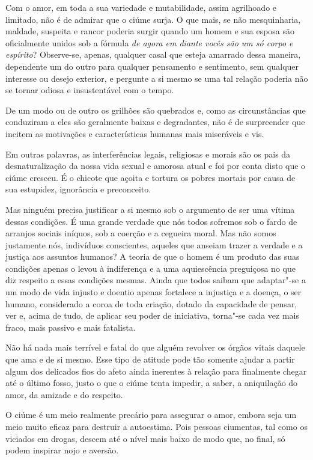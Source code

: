Com o amor, em toda a sua variedade e mutabilidade, assim agrilhoado e
limitado, não é de admirar que o ciúme surja. O que mais, se não
mesquinharia, maldade, suspeita e rancor poderia surgir quando um homem e
sua esposa são oficialmente unidos sob a fórmula \textit{de agora em diante
vocês são um só corpo e espírito}? Observe-se, apenas, qualquer casal que
esteja amarrado dessa maneira, dependente um do outro para qualquer
pensamento e sentimento, sem qualquer interesse ou desejo exterior, e
pergunte a si mesmo se uma tal relação poderia não se tornar odiosa e
insustentável com o tempo.

De um modo ou de outro os grilhões são quebrados e, como as
circunstâncias que conduziram a eles são geralmente baixas e degradantes, não
é de surpreender que incitem as motivações e características humanas
mais miseráveis e vis.

Em outras palavras, as interferências legais, religiosas e morais são os
pais da desnaturalização da nossa vida sexual e amorosa atual e foi por
conta disto que o ciúme cresceu. É o chicote que açoita e tortura os
pobres mortais por causa de sua estupidez, ignorância e preconceito.

Mas ninguém precisa justificar a si mesmo sob o argumento de ser uma
vítima dessas condições. É uma grande verdade que nós todos sofremos sob
o fardo de arranjos sociais iníquos, sob a coerção e a cegueira moral.
Mas não somos justamente nós, indivíduos conscientes, aqueles que
anseiam trazer a verdade e a justiça aos assuntos humanos? A teoria de
que o homem é um produto das suas condições apenas o levou à indiferença
e a uma aquiescência preguiçosa no que diz respeito a essas condições
mesmas. Ainda que todos saibam que adaptar"-se a um modo de vida injusto
e doentio apenas fortalece a injustiça e a doença, o ser humano,
considerado a coroa de toda criação, dotado da capacidade de pensar, ver
e, acima de tudo, de aplicar seu poder de iniciativa, torna"-se cada vez
mais fraco, mais passivo e mais fatalista.

Não há nada mais terrível e fatal do que alguém revolver os órgãos
vitais daquele que ama e de si mesmo. Esse tipo de atitude pode tão
somente ajudar a partir algum dos delicados fios do afeto ainda inerentes à
relação para finalmente chegar até o último fosso, justo o que o ciúme
tenta impedir, a saber, a aniquilação do amor, da amizade e do respeito.

O ciúme é um meio realmente precário para assegurar o amor, embora seja
um meio muito eficaz para destruir a autoestima. Pois pessoas ciumentas,
tal como os viciados em drogas, descem até o nível mais baixo de modo
que, no final, só podem inspirar nojo e aversão.

